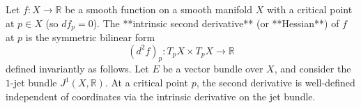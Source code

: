 Let $f: X \to \mathbb{R}$ be a smooth function on a smooth manifold $X$ with a critical point at $p \in X$ (so $df_p = 0$). The **intrinsic second derivative** (or **Hessian**) of $f$ at $p$ is the symmetric bilinear form
$$(d^2 f)_p: T_p X \times T_p X \to \mathbb{R}$$
defined invariantly as follows. Let $E$ be a vector bundle over $X$, and consider the $1$-jet bundle $J^1(X, \mathbb{R})$. At a critical point $p$, the second derivative is well-defined independent of coordinates via the intrinsic derivative on the jet bundle.
